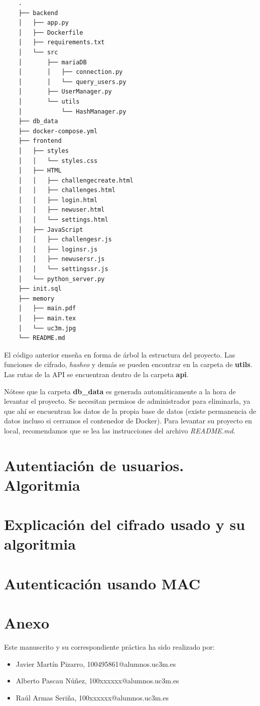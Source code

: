 \documentclass[a4paper,11pt]{report}
\begin{document}
\begin{verbatim}
    .
    ├── backend
    │   ├── app.py
    │   ├── Dockerfile
    │   ├── requirements.txt
    │   └── src
    │       ├── mariaDB
    │       │   ├── connection.py
    │       │   └── query_users.py
    │       ├── UserManager.py
    │       └── utils
    │           └── HashManager.py
    ├── db_data
    ├── docker-compose.yml
    ├── frontend
    │   ├── styles
    │   │   └── styles.css
    │   ├── HTML
    │   │   ├── challengecreate.html
    │   │   ├── challenges.html
    │   │   ├── login.html
    │   │   ├── newuser.html
    │   │   └── settings.html
    │   ├── JavaScript
    │   │   ├── challengesr.js
    │   │   ├── loginsr.js
    │   │   ├── newusersr.js
    │   │   └── settingssr.js
    │   └── python_server.py
    ├── init.sql
    ├── memory
    │   ├── main.pdf
    │   ├── main.tex
    │   └── uc3m.jpg
    └── README.md
    \end{verbatim}

El código anterior enseña en forma de árbol la estructura del proyecto. Las funciones de cifrado, \textit{hasheo} y demás se pueden encontrar en la carpeta de \textbf{utils}. Las rutas de la API se encuentran dentro de la carpeta \textbf{api}.

Nótese que la carpeta \textbf{db\_data} es generada automáticamente a la hora de levantar el proyecto. Se necesitan permisos de administrador para eliminarla, ya que ahí se encuentran los datos de la propia base de datos (existe permanencia de datos incluso si cerramos el contenedor de Docker). Para levantar su proyecto en local, recomendamos que se lea las instrucciones del archivo \textit{README.md}.
    
\section{Autentiación de usuarios. Algoritmia}

\section{Explicación del cifrado usado y su algoritmia}

\section{Autenticación usando MAC}

\section{Anexo}
Este manuscrito y su correspondiente práctica ha sido realizado por:
\begin{itemize}
    \item Javier Martín Pizarro, 100495861@alumnos.uc3m.es
    \item Alberto Pascau Núñez, 100xxxxxx@alumnos.uc3m.es
    \item Raúl Armas Seriña, 100xxxxxx@alumnos.uc3m.es
\end{itemize}
\end{document}
